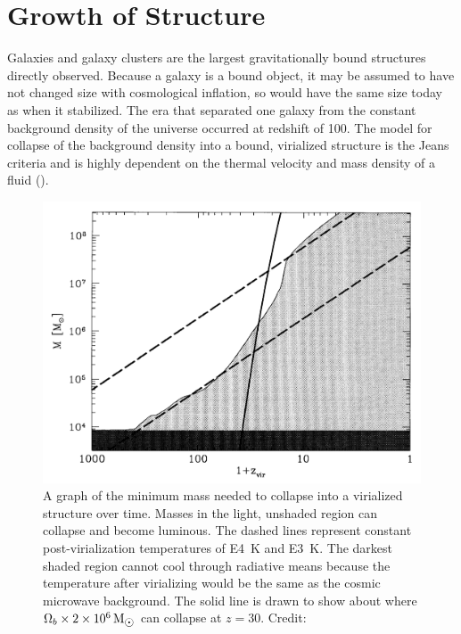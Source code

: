 \documentclass{paper}
\begin{document}
\section*{Growth of Structure}

  Galaxies and galaxy clusters are the largest gravitationally
  bound structures directly observed. Because a galaxy is a bound object,
  it may be assumed to have not changed size with cosmological inflation,
  so would have the same size today as when it stabilized. 
  The era that separated one galaxy from the 
  constant background density of the universe occurred at redshift of 100.
  The model for collapse of the background density into a bound, virialized
  structure is the Jeans criteria and is highly dependent on the thermal 
  velocity and mass density of a fluid (\cite{Jeans1902}).

  \begin{figure}[H]
    \begin{centering}
    \includegraphics[scale=0.5]{Struct-mass.pdf}
    \caption{A graph of the minimum mass needed to collapse into a virialized
      structure over time. Masses in 
      the light, unshaded region can collapse and become luminous. 
      The dashed lines represent 
      constant post-virialization temperatures of \SI{E4}{K} and \SI{E3}{K}. 
      The darkest shaded region cannot cool through radiative means because 
      the temperature after virializing would be the same as the cosmic 
      microwave background. The solid line is drawn to show about where 
      \(\Omega_b \times \SI{2E6}{M_{\astrosun}}\) can collapse at \(z=30\).
    Credit: \cite{1997ApJ...474....1T}}
    \label{fig:Struct-mass}
    \end{centering}
  \end{figure}
\end{document}
